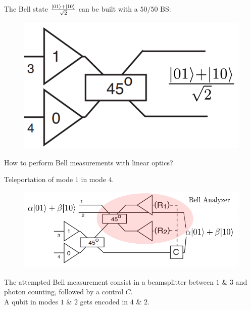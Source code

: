 \documentclass{beamer}
\begin{document}
\begin{frame}
\begin{center}

The Bell state $\frac{\ket{01} + \ket{10}}{\sqrt{2}}$ can be built with a $50/50$ BS:
\begin{figure}[!htb]
\centering \includegraphics[scale=.20]{immagini/entaGeneration.png} 
\end{figure}

\begin{block}{}
\begin{center}
How to perform Bell measurements with linear optics?
\end{center}
\end{block}

\end{center}
\end{frame}


\begin{frame}
\begin{center}

Teleportation of mode $1$ in mode $4$.
\begin{figure}[!htb]
\centering
\includegraphics[scale=.4]{immagini/tele5.png}
\end{figure}
The attempted Bell measurement consist in a beamsplitter between $1$ \& $3$ and photon counting, followed by a control $C$.\\
A qubit in modes $1$ \& $2$ gets encoded in $4$ \& $2$.

\end{center}
\end{frame}
\end{document}

